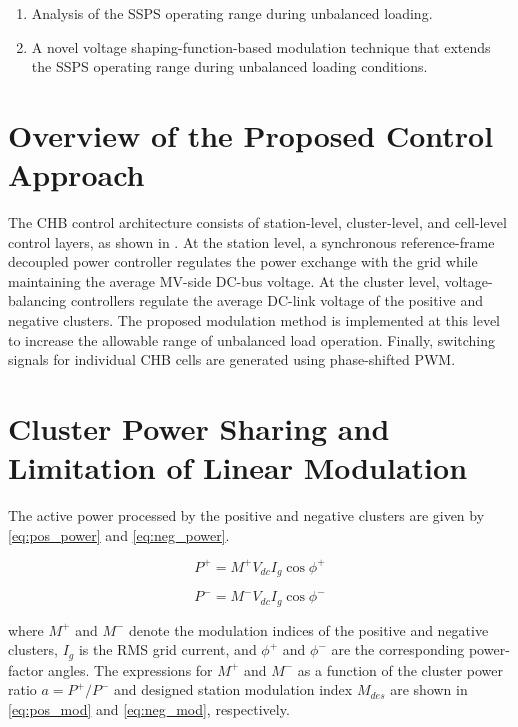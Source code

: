 \documentclass[conference]{IEEEtran}
\begin{document}
\begin{enumerate}
    \item Analysis of the SSPS operating range during unbalanced loading.
    \item A novel voltage shaping-function-based modulation technique that extends the SSPS operating range during unbalanced loading conditions.
\end{enumerate}

\section{Overview of the Proposed Control Approach}

The CHB control architecture consists of station-level, cluster-level, and cell-level control layers, as shown in . At the station level, a synchronous reference-frame decoupled power controller regulates the power exchange with the grid while maintaining the average MV-side DC-bus voltage. At the cluster level, voltage-balancing controllers regulate the average DC-link voltage of the positive and negative clusters. The proposed modulation method is implemented at this level to increase the allowable range of unbalanced load operation. Finally, switching signals for individual CHB cells are generated using phase-shifted PWM.

\section{Cluster Power Sharing and Limitation of Linear Modulation}

The active power processed by the positive and negative clusters are given by \cref{eq:pos_power} and \cref{eq:neg_power}.

\begin{equation}
P^+ = M^+ V_{dc} I_g \cos\phi^+
\label{eq:pos_power}
\end{equation}

\begin{equation}
P^- = M^- V_{dc} I_g \cos\phi^-
\label{eq:neg_power}
\end{equation}

where $M^+$ and $M^-$ denote the modulation indices of the positive and negative clusters, $I_g$ is the RMS grid current, and $\phi^+$ and $\phi^-$ are the corresponding power-factor angles. The expressions for \(M^{+}\) and \(M^{-}\) as a function of the cluster power ratio \(a = P^{+}/P^{-}\) and designed station modulation index \(M_{des}\) are shown in \cref{eq:pos_mod} and \cref{eq:neg_mod}, respectively.
\end{document}
